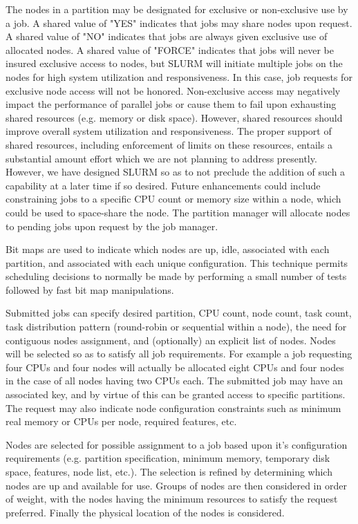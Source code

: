 The nodes in a partition may be designated for exclusive or non-exclusive
use by a job.  A shared value of "YES" indicates that jobs may share nodes
upon request.  A shared value of "NO" indicates that jobs are always given
exclusive use of allocated nodes.  A shared value of "FORCE" indicates
that jobs will never be insured exclusive access to nodes, but SLURM
will initiate multiple jobs on the nodes for high system utilization
and responsiveness.  In this case, job requests for exclusive node
access will not be honored.  Non-exclusive access may negatively impact
the performance of parallel jobs or cause them to fail upon exhausting
shared resources (e.g. memory or disk space). However, shared resources
should improve overall system utilization and responsiveness. The
proper support of shared resources, including enforcement of limits on
these resources, entails a substantial amount effort which we are not
planning to address presently.  However, we have designed SLURM so as
to not preclude the addition of such a capability at a later time if
so desired.  Future enhancements could include constraining jobs to a
specific CPU count or memory size within a node, which could be used
to space-share the node.  The partition manager will allocate nodes to
pending jobs upon request by the job manager.

Bit maps are used to indicate which nodes are up, idle, associated
with each partition, and associated with each unique configuration.
This technique permits scheduling decisions to normally be made by
performing a small number of tests followed by fast bit map manipulations.

Submitted jobs can specify desired partition, CPU count, node count,
task count, task distribution pattern (round-robin or sequential within
a node), the need for contiguous nodes assignment, and (optionally)
an explicit list of nodes.  Nodes will be selected so as to satisfy all
job requirements.  For example a job requesting four CPUs and four nodes
will actually be allocated eight CPUs and four nodes in the case of all
nodes having two CPUs each.  The submitted job may have an associated
key, and by virtue of this can be granted access to specific partitions.
The request may also indicate node configuration constraints such as
minimum real memory or CPUs per node, required features, etc.

Nodes are selected for possible assignment to a job based upon it's
configuration requirements (e.g. partition specification, minimum memory,
temporary disk space, features, node list, etc.).  The selection is
refined by determining which nodes are up and available for use.
Groups of nodes are then considered in order of weight, with the
nodes having the minimum resources to satisfy the request preferred.
Finally the physical location of the nodes is considered.

